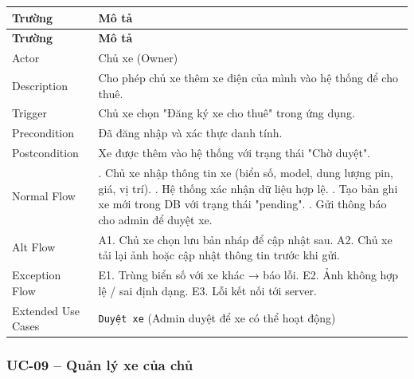 \begin{longtable}{|>{\raggedright\arraybackslash}p{4cm}|>{\raggedright\arraybackslash}p{11cm}|}
\hline
\textbf{Trường} & \textbf{Mô tả} \\
\hline
\endfirsthead

\hline
\textbf{Trường} & \textbf{Mô tả} \\
\hline
\endhead

\hline
\endfoot

Actor & Chủ xe (Owner) \\
\hline
Description & Cho phép chủ xe thêm xe điện của mình vào hệ thống để cho thuê. \\
\hline
Trigger & Chủ xe chọn "Đăng ký xe cho thuê" trong ứng dụng. \\
\hline
Precondition & Đã đăng nhập và xác thực danh tính. \\
\hline
Postcondition & Xe được thêm vào hệ thống với trạng thái "Chờ duyệt". \\
\hline
Normal Flow & 1. Chủ xe nhập thông tin xe (biển số, model, dung lượng pin, giá, vị trí). \newline 2. Hệ thống xác nhận dữ liệu hợp lệ. \newline 3. Tạo bản ghi xe mới trong DB với trạng thái "pending". \newline 4. Gửi thông báo cho admin để duyệt xe. \\
\hline
Alt Flow & A1. Chủ xe chọn lưu bản nháp để cập nhật sau. \newline A2. Chủ xe tải lại ảnh hoặc cập nhật thông tin trước khi gửi. \\
\hline
Exception Flow & E1. Trùng biển số với xe khác → báo lỗi. \newline E2. Ảnh không hợp lệ / sai định dạng. \newline E3. Lỗi kết nối tới server. \\
\hline
Extended Use Cases & \texttt{Duyệt xe} (Admin duyệt để xe có thể hoạt động) \\
\hline
\end{longtable}

\subsubsection*{UC-09 – Quản lý xe của chủ}

